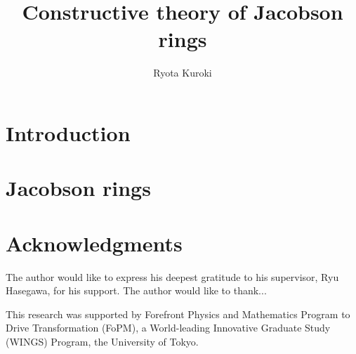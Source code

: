 \documentclass{article}
\title{Constructive theory of Jacobson rings}
\author{Ryota Kuroki}
\affil{Graduate School of Mathematical Sciences, The University of Tokyo}
\date{}
\begin{document}
\maketitle
\section{Introduction}
\section{Jacobson rings}
\section*{Acknowledgments}
The author would like to express his deepest gratitude to his supervisor, Ryu Hasegawa, for his support.
The author would like to thank...

This research was supported by Forefront Physics and Mathematics Program to Drive Transformation (FoPM), a World-leading Innovative Graduate Study (WINGS) Program, the University of Tokyo.
\end{document}
